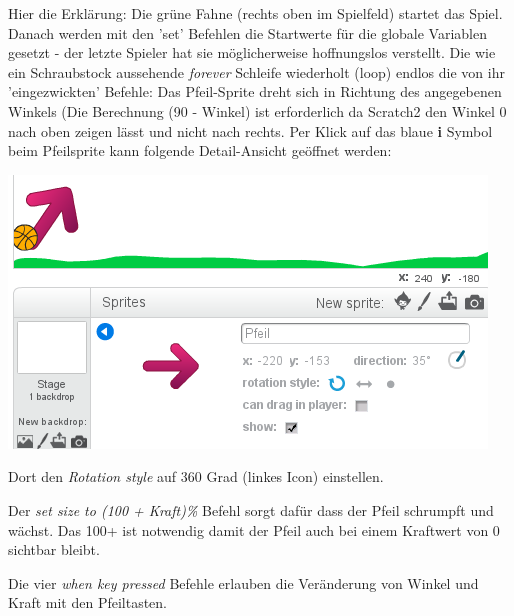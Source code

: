 Hier die Erklärung: Die grüne Fahne (rechts oben im Spielfeld) startet das Spiel. Danach werden mit den 'set' Befehlen die Startwerte für die globale Variablen gesetzt - der letzte Spieler hat sie möglicherweise hoffnungslos verstellt. Die wie ein Schraubstock aussehende \textit{forever} Schleife wiederholt (loop) endlos die von ihr 'eingezwickten' Befehle: Das Pfeil-Sprite dreht sich in Richtung des angegebenen Winkels (Die Berechnung (90 - Winkel) ist erforderlich da Scratch2 den Winkel 0 nach oben zeigen lässt und nicht nach rechts. Per Klick auf das blaue \textbf{i} Symbol beim Pfeilsprite kann folgende Detail-Ansicht geöffnet werden: 

\begin{center}
\includegraphics[width=\linewidth]{scratch/farrow.png}
\end{center}

Dort den \textit{Rotation style} auf 360 Grad (linkes Icon) einstellen.

Der \textit{set size to (100 + Kraft)\%} Befehl sorgt dafür dass der Pfeil schrumpft und wächst. Das 100+ ist notwendig damit der Pfeil auch bei einem Kraftwert von 0 sichtbar bleibt.

Die vier \textit{when key pressed} Befehle erlauben die Veränderung von Winkel und Kraft mit den Pfeiltasten.
\newpage
